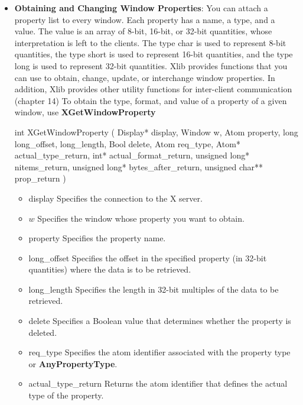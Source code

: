 \documentclass{report}
\begin{document}
\begin{itemize}
\begin{cppcode}
        typedef unsigned long Atom;
        \end{cppcode}
    \item \textbf{Obtaining and Changing Window Properties}: You can attach a property list to every window. Each property has a name, a type, and a value. The value is an array of 8-bit, 16-bit, or 32-bit quantities, whose interpretation is left to the clients. The type char is used to represent 8-bit quantities, the type short is used to represent 16-bit quantities, and the type long is used to represent 32-bit quantities. 
        \bigbreak \noindent 
        Xlib provides functions that you can use to obtain, change, update, or interchange window properties. In addition, Xlib provides other utility functions for inter-client communication (chapter 14)
        \bigbreak \noindent 
        To obtain the type, format, and value of a property of a given window, use \textbf{XGetWindowProperty}
        \bigbreak \noindent 
        \begin{cppcode}
            int XGetWindowProperty (
                Display* display,
                Window w,
                Atom property,
                long long_offset, long_length,
                Bool delete,
                Atom req_type,
                Atom* actual_type_return,
                int* actual_format_return,
                unsigned long* nitems_return,
                unsigned long* bytes_after_return,
                unsigned char** prop_return
            )
        \end{cppcode}
        \begin{itemize}
            \item display Specifies the connection to the X server.
            \item $w$ Specifies the window whose property you want to obtain.
            \item property Specifies the property name.
            \item long\_offset Specifies the offset in the specified property (in 32-bit quantities) where the data is to be retrieved.
            \item long\_length Specifies the length in 32-bit multiples of the data to be retrieved.
            \item delete Specifies a Boolean value that determines whether the property is deleted.
            \item req\_type Specifies the atom identifier associated with the property type or \textbf{AnyPropertyType}.
            \item actual\_type\_return Returns the atom identifier that defines the actual type of the property.

\end{itemize}
\end{itemize}
\end{document}
